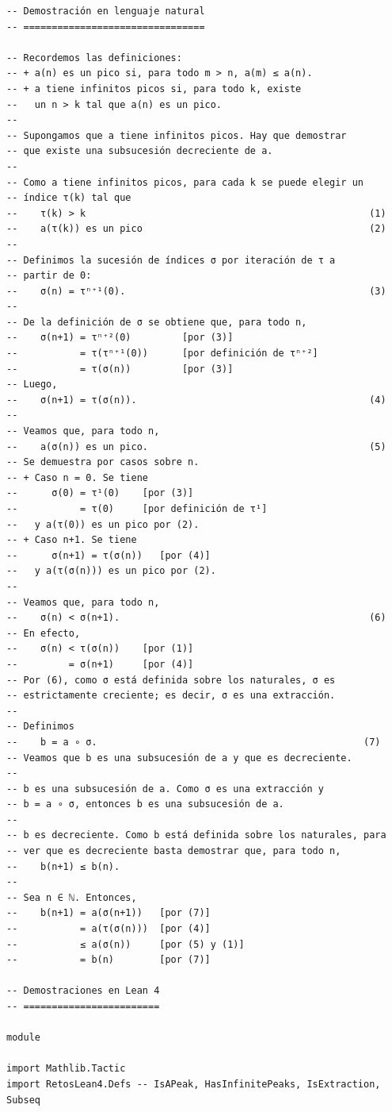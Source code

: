 \begin{verbatim}
-- Demostración en lenguaje natural
-- ================================

-- Recordemos las definiciones:
-- + a(n) es un pico si, para todo m > n, a(m) ≤ a(n).
-- + a tiene infinitos picos si, para todo k, existe
--   un n > k tal que a(n) es un pico.
--
-- Supongamos que a tiene infinitos picos. Hay que demostrar
-- que existe una subsucesión decreciente de a.
--
-- Como a tiene infinitos picos, para cada k se puede elegir un
-- índice τ(k) tal que
--    τ(k) > k                                                  (1)
--    a(τ(k)) es un pico                                        (2)
--
-- Definimos la sucesión de índices σ por iteración de τ a
-- partir de 0:
--    σ(n) = τⁿ⁺¹(0).                                           (3)
--
-- De la definición de σ se obtiene que, para todo n,
--    σ(n+1) = τⁿ⁺²(0)         [por (3)]
--           = τ(τⁿ⁺¹(0))      [por definición de τⁿ⁺²]
--           = τ(σ(n))         [por (3)]
-- Luego,
--    σ(n+1) = τ(σ(n)).                                         (4)
--
-- Veamos que, para todo n,
--    a(σ(n)) es un pico.                                       (5)
-- Se demuestra por casos sobre n.
-- + Caso n = 0. Se tiene
--      σ(0) = τ¹(0)    [por (3)]
--           = τ(0)     [por definición de τ¹]
--   y a(τ(0)) es un pico por (2).
-- + Caso n+1. Se tiene
--      σ(n+1) = τ(σ(n))   [por (4)]
--   y a(τ(σ(n))) es un pico por (2).
--
-- Veamos que, para todo n,
--    σ(n) < σ(n+1).                                            (6)
-- En efecto,
--    σ(n) < τ(σ(n))    [por (1)]
--         = σ(n+1)     [por (4)]
-- Por (6), como σ está definida sobre los naturales, σ es
-- estrictamente creciente; es decir, σ es una extracción.
--
-- Definimos
--    b = a ∘ σ.                                               (7)
-- Veamos que b es una subsucesión de a y que es decreciente.
--
-- b es una subsucesión de a. Como σ es una extracción y
-- b = a ∘ σ, entonces b es una subsucesión de a.
--
-- b es decreciente. Como b está definida sobre los naturales, para
-- ver que es decreciente basta demostrar que, para todo n,
--    b(n+1) ≤ b(n).
--
-- Sea n ∈ ℕ. Entonces,
--    b(n+1) = a(σ(n+1))   [por (7)]
--           = a(τ(σ(n)))  [por (4)]
--           ≤ a(σ(n))     [por (5) y (1)]
--           = b(n)        [por (7)]

-- Demostraciones en Lean 4
-- ========================

module

import Mathlib.Tactic
import RetosLean4.Defs -- IsAPeak, HasInfinitePeaks, IsExtraction, Subseq


\end{verbatim}
